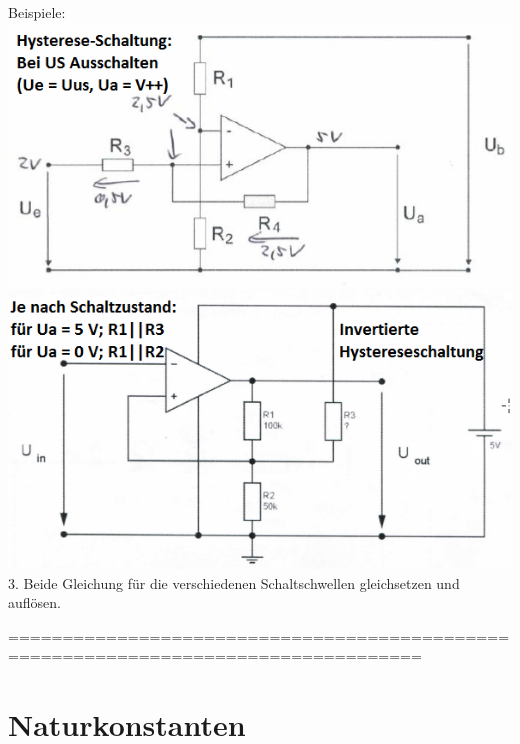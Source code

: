 \documentclass[fs, footer]{latex4ei}
\begin{document}
\begin{multicols*}{4}
{ Beispiele: \\
 \includegraphics[scale = 0.4]{./img/Hystereseschaltung.png} \\
 \includegraphics[scale = 0.4]{./img/Hystereseschaltung_invert.png} \\
 

3. Beide Gleichung für die verschiedenen Schaltschwellen gleichsetzen und auflösen.
}



====================================================================================
\section{Naturkonstanten}


\end{multicols*}
\end{document}
